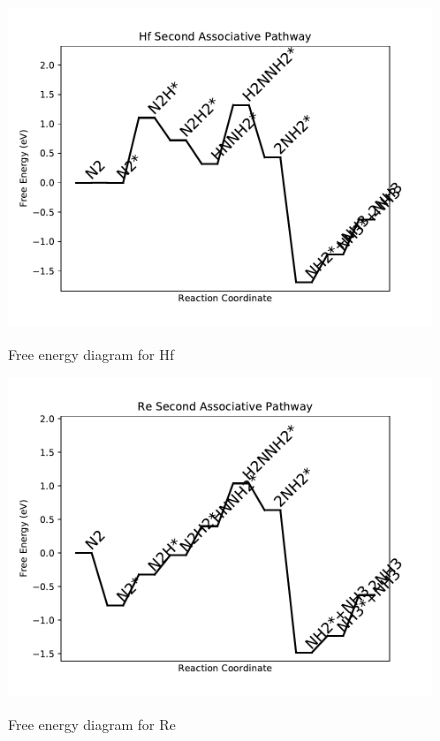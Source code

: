 \documentclass{article}
\begin{document}
\newpage
\begin{figure}
\includegraphics[width=1\linewidth]{data/plots/Hf_associative_2.pdf}
\label{fig:Hf_associative_2}
\caption{Free energy diagram for Hf}
\end{figure}

\begin{figure}
\includegraphics[width=1\linewidth]{data/plots/Re_associative_2.pdf}
\label{fig:Re_associative_2}
\caption{Free energy diagram for Re}
\end{figure}
\end{document}
